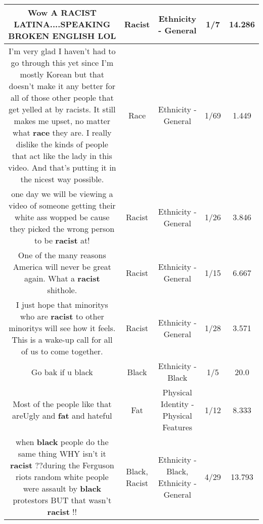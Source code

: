 \documentclass[11pt]{article}
\newlength\mylength
\begin{document}
\begin{center}
\begin{longtable}{|C{.65\mylength}|C{.30\mylength}|C{.12\mylength}|C{.12\mylength}|C{.12\mylength}|}
  \small Wow A \textbf{RACIST} LATINA....SPEAKING BROKEN ENGLISH LOL\normalsize   & Racist & Ethnicity - General & 1/7 & 14.286 \\  \hline
  \small I'm very glad I haven't had to go through this yet since I'm mostly Korean but that doesn't make it any better for all of those other people that get yelled at by racists. It still makes me upset, no matter what \textbf{race} they are. I really dislike the kinds of people that act like the lady in this video. And that's putting it in the nicest way possible.\normalsize   & Race & Ethnicity - General & 1/69 & 1.449 \\  \hline
  \small one day we will be viewing a video of someone getting their white ass wopped be cause they picked the wrong person to be \textbf{racist} at!\normalsize   & Racist & Ethnicity - General & 1/26 & 3.846 \\  \hline
  \small One of the many reasons America will never be great again.  What a \textbf{racist} shithole.\normalsize   & Racist & Ethnicity - General & 1/15 & 6.667 \\  \hline
  \small I  just hope that minoritys who are \textbf{racist} to other minoritys will see how it feels.  This is a wake-up call for all of us to come together.\normalsize   & Racist & Ethnicity - General & 1/28 & 3.571 \\  \hline
  \small Go bak if u black\normalsize   & Black & Ethnicity - Black & 1/5 & 20.0 \\  \hline
  \small Most of the people like that areUgly and \textbf{fat} and hateful\normalsize   & Fat & Physical Identity - Physical Features & 1/12 & 8.333 \\  \hline
  \small when \textbf{black} people do the same thing WHY isn't it \textbf{racist} ??during the Ferguson riots random white people were assault by \textbf{black} protestors BUT that wasn't \textbf{racist} !!\normalsize   & Black, Racist & Ethnicity - Black, Ethnicity - General & 4/29 & 13.793 \\  \hline

\end{longtable}
\end{center}
\end{document}
